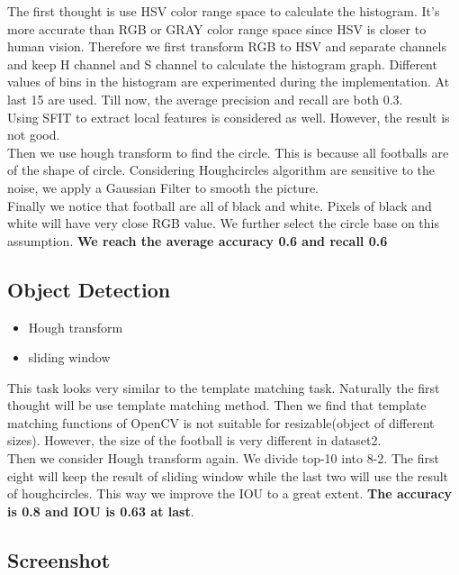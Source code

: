 \documentclass[12pt]{article}
\begin{document}
The first thought is use HSV color range space to calculate the histogram. It's more accurate than RGB or GRAY color range space since HSV is closer to human vision. Therefore we first transform RGB to HSV and separate channels and keep H channel and S channel to calculate the histogram graph. Different values of bins in the histogram are experimented during the implementation. At last 15 are used. Till now, the average precision and recall are both 0.3.\\

Using SFIT to extract local features  is considered as well. However, the result is not good.\\

Then we use hough transform to find the circle. This is because all footballs are of the shape of circle. Considering Houghcircles algorithm are sensitive to the noise, we apply a Gaussian Filter to smooth the picture.\\

Finally we notice that football are all of black and white. Pixels of  black and white will have very close RGB value. We further select the circle base on this assumption. \textbf{We reach the average accuracy 0.6 and recall 0.6}\\

\subsection*{Object Detection}
\begin{itemize}
  \item Hough transform
  \item sliding window
\end{itemize}

This task looks very similar to the template matching task. Naturally the first thought will be use template matching method. Then we find that template matching functions of OpenCV is not suitable for resizable(object of different sizes). However, the size of the football is very different in dataset2.\\

Then we consider Hough transform again. We divide top-10 into 8-2. The first eight will keep the result of sliding window while the last two will use the result of houghcircles. This way we improve the IOU to a great extent. \textbf{The accuracy is 0.8 and IOU is 0.63 at last}.\\

\subsection*{Screenshot}
\end{document}
